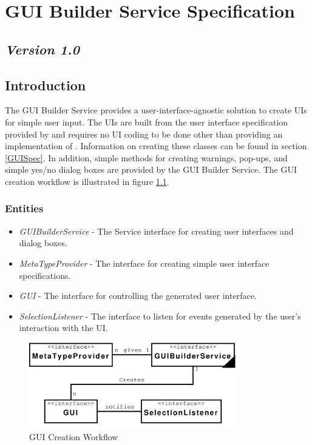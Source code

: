\chapter{GUI Builder Service Specification}
\section*{\textit{Version 1.0}}
\section{Introduction}

The GUI Builder Service provides a user-interface-agnostic solution to create UIs
for simple user input. The UIs are built from the user interface specification
provided by  and requires no UI coding to be done other
than providing an implementation of . Information on
creating these classes can be found in section \ref{GUISpec}. In addition, simple
methods for creating warnings, pop-ups, and simple yes/no dialog boxes are
provided by the GUI Builder Service. The GUI creation workflow is illustrated in
figure \ref{fig:guiCreationWorkflow}.

\subsection{Entities}

\begin{itemize}
  \item \textit{GUIBuilderService} - The Service interface for creating
  user interfaces and dialog boxes.
  \item \textit{MetaTypeProvider} - The interface for creating simple user
  interface specifications.
  \item \textit{GUI} - The interface for controlling the
   generated user interface.
  \item \textit{SelectionListener} - The interface to listen for events
  generated by the user's interaction with the UI.
\end{itemize}

\begin{figure}[htb!]
\centering
\includegraphics[width=90mm]{../img/guiCreationWorkflow.pdf}
\caption{GUI Creation Workflow}
\label{fig:guiCreationWorkflow}
\end{figure}

\orgcishellserviceguibuilder{}
